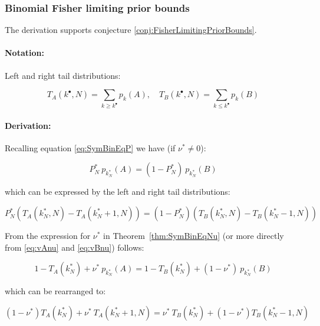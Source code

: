\documentclass{article}
\theoremstyle{definition}
\begin{document}
\subsubsection{Binomial Fisher limiting prior bounds}

The derivation supports conjecture \ref{conj:FisherLimitingPriorBounds}.

\paragraph{Notation:}
Left and right tail distributions:

\begin{equation}
    T_A(k^\bullet,N) = \sum_{k \ge k^\bullet} p_k(A),
    \quad
    T_B(k^\bullet,N) = \sum_{k \le k^\bullet} p_k(B)
\end{equation}

\paragraph{Derivation:}

Recalling equation \eqref{eq:SymBinEqP} we have (if $\nu^* \ne 0$):

\begin{equation}
    P^*_N \ p_{k^*_N}(A) = (1-P^*_N) \ p_{k^*_N}(B)
\end{equation}

which can be expressed by the left and right tail distributions:

\begin{equation}
\label{eq:P*TATB}
    P^*_N \left ( T_A(k^*_N,N) - T_A(k^*_N+1,N)  \right ) 
    = 
    (1-P^*_N) \left ( T_B(k^*_N,N) - T_B(k^*_N-1,N)  \right ) 
\end{equation}

From the expression for $\nu^*$ in Theorem~\ref{thm:SymBinEqNu} (or more directly from \eqref{eq:vAnu} and \eqref{eq:vBnu}) follows:

\begin{equation}
    1 - T_A(k^*_N) + \nu^* \ p_{k^*_N}(A) = 
    1 - T_B(k^*_N) + (1-\nu^*) \ p_{k^*_N}(B)
\end{equation}

which can be rearranged to:

\begin{equation}
\label{eq:nu*TATB}
    (1-\nu^*) T_A(k^*_N) + \nu^* \ T_A(k^*_N+1,N) =
    \nu^* \ T_B(k^*_N) + (1-\nu^*) T_B(k^*_N-1,N)
\end{equation}
\end{document}

